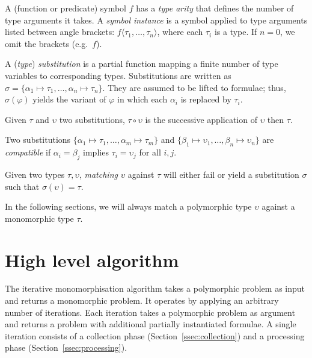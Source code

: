 \documentclass[]{ceurart}
\begin{document}
\begin{definition}%
A (function or predicate) {symbol} \(f\) has a \emph{type arity} that defines the number of type arguments it takes. A \emph{symbol instance} is a symbol applied to type arguments listed between angle brackets: \(f\langle \tau_1, \dots, \tau_n\rangle\), where each $\tau_i$ is a type. If $n = 0$, we omit the brackets (e.g.\ $f$).
\end{definition}

\begin{definition}
A (\emph{type}) \emph{substitution} is a partial function mapping a finite number of type variables to corresponding types. Substitutions are written as
$\sigma = \{\alpha_1\mapsto\tau_1, \dots, \alpha_n\mapsto\tau_n\}$. They are assumed to be lifted to formulae; thus, $\sigma(\varphi)$ yields the variant of $\varphi$ in which each $\alpha_i$ is replaced by $\tau_i$.

Given \(\tau\) and \(\upsilon\) two substitutions, \(\tau \circ \upsilon\) is the successive application of \(\upsilon\) then \(\tau\).
\end{definition}

\begin{definition}
Two substitutions \(\{\alpha_1 \mapsto \tau_1, \dots, \alpha_m\mapsto\tau_m\}\) and \(\{\beta_1 \mapsto \upsilon_1, \dots, \beta_n\mapsto\upsilon_n\}\) are \emph{compatible} if \(\alpha_i = \beta_j\) implies \(\tau_i = \upsilon_j\) for all \(i, j\).
\end{definition}


\begin{definition}
Given two types \(\tau, \upsilon\), \emph{matching} \(\upsilon\) against \(\tau\) will either fail or yield a substitution \(\sigma\) such that \(\sigma(\upsilon) = \tau\).
\end{definition}

In the following sections, we will always match a polymorphic type $\upsilon$ against a monomorphic type $\tau$.

\section{High level algorithm}
\label{sec:high-level-algorithm}

The iterative monomorphisation algorithm takes a polymorphic problem as input and returns a monomorphic problem. It operates by applying an arbitrary number of iterations. Each iteration takes a polymorphic problem as argument and returns a problem with additional partially instantiated formulae. A single iteration consists of a collection phase (Section~\ref{ssec:collection}) and a processing phase (Section~\ref{ssec:processing}).
\end{document}
